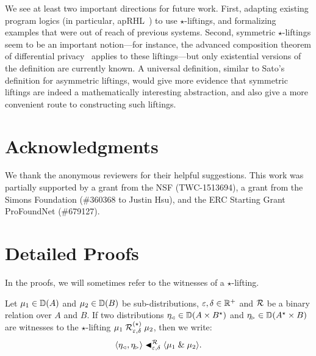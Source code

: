 \documentclass{lmcs}
\begin{document}
We see at least two important directions for future work. First, adapting
existing program logics (in particular, \textsf{apRHL}~\citep{BartheKOZ13}) to
use $\star$-liftings, and formalizing examples that were out of reach of
previous systems. Second, symmetric $\star$-liftings seem to be an important
notion---for instance, the advanced composition theorem of differential
privacy~\citep{DRV10} applies to these liftings---but only existential versions
of the definition are currently known. A universal definition, similar to Sato's
definition for asymmetric liftings, would give more evidence that symmetric
liftings are indeed a mathematically interesting abstraction, and also give a
more convenient route to constructing such liftings.

\section*{Acknowledgments}

We thank the anonymous reviewers for their helpful suggestions. This work was
partially supported by a grant from the NSF (TWC-1513694), a grant from the
Simons Foundation (\#360368 to Justin Hsu), and the ERC Starting Grant
ProFoundNet (\#679127).



\ifappendix
\newpage\appendix

\section{Detailed Proofs}

In the proofs, we will sometimes refer to the witnesses of a $\star$-lifting.

\begin{nota}
  Let $\mu_1 \in {\mathbb{D}}(A)$ and $\mu_2 \in {\mathbb{D}}(B)$ be sub-distributions,
  $\varepsilon, \delta \in \mathbb{R}^+$ and $\mathrel{\mathcal{R}}$ be a binary relation over $A$ and $B$.
  If two distributions $\eta_{\mspace{-1.5mu}{\scriptscriptstyle \vartriangleleft}} \in {\mathbb{D}}(A \times B^\star)$ and $\eta_{\mspace{-1.5mu}{\scriptscriptstyle \vartriangleright}}
  \in {\mathbb{D}}(A^\star \times B)$ are witnesses to the $\star$-lifting $\mu_1
  \mathrel{\mathrel{\mathrel{\mathcal{R}}^{(\star)}_{\varepsilon, \delta}}} \mu_2$, then we write:
  \[
    \langle {\eta_{\mspace{-1.5mu}{\scriptscriptstyle \vartriangleleft}}, \eta_{\mspace{-1.5mu}{\scriptscriptstyle \vartriangleright}}} \rangle \mathrel{\blacktriangleleft_{\varepsilon,\delta}^{\mathrel{\mathcal{R}}}} \langle {\mu_1} \mathrel{\&} {\mu_2} \rangle .
  \]
\end{nota}

\printproofs
\fi
\end{document}
